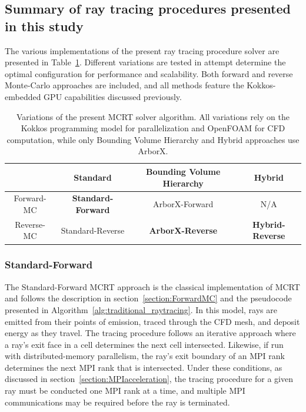\subsection{Summary of ray tracing procedures presented in this study}\label{section:SummaryOfSolvers}

The various implementations of the present ray tracing procedure solver are presented in Table~\ref{table:SolverImplementations}. Different variations are tested in attempt determine the optimal configuration for performance and scalability. Both forward and reverse Monte-Carlo approaches are included, and all methods feature the Kokkos-embedded GPU capabilities discussed previously.

\begin{table}
\centering
\caption{Variations of the present MCRT solver algorithm. All variations rely on the Kokkos programming model for parallelization and OpenFOAM for CFD computation, while only Bounding Volume Hierarchy and Hybrid approaches use ArborX.}
\begin{tabular}{c | c c c} 
 \hline
 ~ & Standard & Bounding Volume Hierarchy & Hybrid \\ [0.5ex] 
 \hline
 Forward-MC & \textbf{Standard-Forward} & ArborX-Forward & N/A  \\
 Reverse-MC & Standard-Reverse & \textbf{ArborX-Reverse} & \textbf{Hybrid-Reverse} \\
 \hline
\end{tabular}
\label{table:SolverImplementations}
\end{table}

\subsubsection{Standard-Forward}
The Standard-Forward MCRT approach is the classical implementation of MCRT and follows the description in section~\ref{section:ForwardMC} and the pseudocode presented in Algorithm~\ref{alg:traditional_raytracing}. In this model, rays are emitted from their points of emission, traced through the CFD mesh, and deposit energy as they travel. The tracing procedure follows an iterative approach where a ray's exit face in a cell determines the next cell intersected. Likewise, if run with distributed-memory parallelism, the ray's exit boundary of an MPI rank determines the next MPI rank that is intersected. Under these conditions, as discussed in section~\ref{section:MPIacceleration}, the tracing procedure for a given ray must be conducted one MPI rank at a time, and multiple MPI communications may be required before the ray is terminated.

